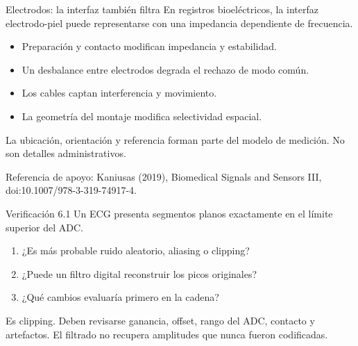 \documentclass[
  ignorenonframetext,
  aspectratio=169,
  spanish,
  professionalfonts]{beamer}
\providecommand{\tightlist}{%
  \setlength{\itemsep}{0pt}\setlength{\parskip}{0pt}}
\begin{document}
\begin{frame}{Electrodos: la interfaz también filtra}
\protect{}\label{electrodos-la-interfaz-tambiuxe9n-filtra}
En registros bioeléctricos, la interfaz electrodo-piel puede
representarse con una impedancia dependiente de frecuencia.

\begin{itemize}
\tightlist
\item
  Preparación y contacto modifican impedancia y estabilidad.
\item
  Un desbalance entre electrodos degrada el rechazo de modo común.
\item
  Los cables captan interferencia y movimiento.
\item
  La geometría del montaje modifica selectividad espacial.
\end{itemize}

\begin{tcolorbox}[enhanced jigsaw, arc=.35mm, bottomrule=.15mm, bottomtitle=1mm, breakable, colback=white, colbacktitle=quarto-callout-important-color!10!white, colframe=quarto-callout-important-color-frame, coltitle=black, left=2mm, leftrule=.75mm, opacityback=0, opacitybacktitle=0.6, rightrule=.15mm, title={Consecuencia}, titlerule=0mm, toprule=.15mm, toptitle=1mm]

La ubicación, orientación y referencia forman parte del modelo de
medición. No son detalles administrativos.

\end{tcolorbox}

Referencia de apoyo: Kaniusas (2019), Biomedical Signals and Sensors
III, doi:10.1007/978-3-319-74917-4.
\end{frame}

\begin{frame}{Verificación 6.1}
\protect{}\label{verificaciuxf3n-6.1}
Un ECG presenta segmentos planos exactamente en el límite superior del
ADC.

\begin{enumerate}
\tightlist
\item
  ¿Es más probable ruido aleatorio, aliasing o clipping?
\item
  ¿Puede un filtro digital reconstruir los picos originales?
\item
  ¿Qué cambios evaluaría primero en la cadena?
\end{enumerate}

\begin{tcolorbox}[enhanced jigsaw, arc=.35mm, bottomrule=.15mm, bottomtitle=1mm, breakable, colback=white, colbacktitle=quarto-callout-note-color!10!white, colframe=quarto-callout-note-color-frame, coltitle=black, left=2mm, leftrule=.75mm, opacityback=0, opacitybacktitle=0.6, rightrule=.15mm, title={Respuesta esperada}, titlerule=0mm, toprule=.15mm, toptitle=1mm]

Es clipping. Deben revisarse ganancia, offset, rango del ADC, contacto y
artefactos. El filtrado no recupera amplitudes que nunca fueron
codificadas.

\end{tcolorbox}
\end{frame}
\end{document}
